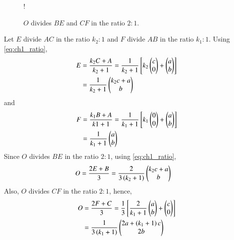 %
\begin{figure}[!h]
\centering
\resizebox {\columnwidth} {!} {

}
\caption{$O$ divides $BE$ and $CF$ in the ratio $2:1$.}
\label{fig:ch1_two_median_conv}
\end{figure}
\proof  Let $E$ divide $AC$ in the ratio $k_2:1$ and $F$ divide $AB$ in the ratio $k_1:1$. Using \eqref{eq:ch1_ratio},
\begin{align}
E &= \frac{k_2C+A}{k_2+1} = \frac{1}{k_2+1}{}\left[k_2
\begin{pmatrix}
c
\\
0
\end{pmatrix}
+
\begin{pmatrix}
a
\\
b
\end{pmatrix}
\right]
\\
&=
\frac{1}{k_2+1}
\begin{pmatrix}
k_2c+a
\\
b
\end{pmatrix}
\end{align}
and
\begin{align}
F &= \frac{k_1B+A}{k1+1} = \frac{1}{k_1+1}{}\left[k_1
\begin{pmatrix}
0
\\
0
\end{pmatrix}
+
\begin{pmatrix}
a
\\
b
\end{pmatrix}
\right]
\\
&=
\frac{1}{k_1+1}
\begin{pmatrix}
a
\\
b
\end{pmatrix}
\end{align}
Since $O$ divides $BE$ in the ratio $2:1$, using \eqref{eq:ch1_ratio},
\begin{align}
O &= \frac{2E+B}{3} = \frac{2}{3\left(k_2+1\right)}
\begin{pmatrix}
k_2c+a
\\
b
\end{pmatrix}
\label{eq:ch1_Oratio_1}
\end{align}
Also, $O$ divides $CF$ in the ratio $2:1$, hence,
%
\begin{align}
O &= \frac{2F+C}{3} = \frac{1}{3}
{}\left[\frac{2}{k_1+1}
\begin{pmatrix}
a
\\
b
\end{pmatrix}
+
\begin{pmatrix}
c
\\
0
\end{pmatrix}
\right]
\\
&=
\frac{1}{3\left(k_1+1\right)}
\begin{pmatrix}
2a+\left(k_1+1\right)c
\\
2b
\end{pmatrix}
\label{eq:ch1_Oratio_2}
\end{align}
